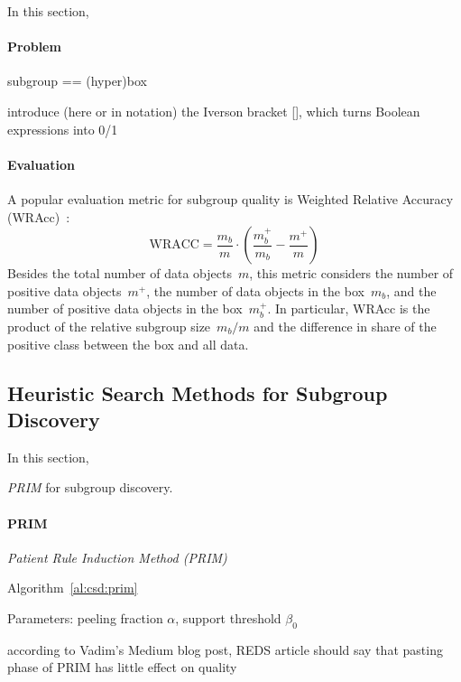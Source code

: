 \documentclass{article}
\theoremstyle{definition}
\begin{document}
In this section,

\paragraph{Problem}

subgroup == (hyper)box

introduce (here or in notation) the Iverson bracket [], which turns Boolean expressions into 0/1

\paragraph{Evaluation}

A popular evaluation metric for subgroup quality is Weighted Relative Accuracy (WRAcc)~\cite{lavravc1999rule}:
%
\begin{equation}
	\text{WRACC} = \frac{m_b}{m} \cdot \left( \frac{m_b^+}{m_b} - \frac{m^+}{m} \right)
	\label{eq:csd:wracc}
\end{equation}
%
Besides the total number of data objects~$m$, this metric considers the number of positive data objects~$m^+$, the number of data objects in the box~$m_b$, and the number of positive data objects in the box~$m_b^+$.
In particular, WRAcc is the product of the relative subgroup size~$m_b / m$ and the difference in share of the positive class between the box and all data.

\subsection{Heuristic Search Methods for Subgroup Discovery}
\label{sec:csd:fundamentals:heuristics}

In this section,

\begin{algorithm}[t]
	\DontPrintSemicolon
	\caption{\emph{PRIM} for subgroup discovery.}
	\label{al:csd:prim}
\end{algorithm}

\paragraph{PRIM}

\emph{Patient Rule Induction Method (PRIM)}~\cite{friedman1999bump}

Algorithm~\ref{al:csd:prim}

Parameters: peeling fraction $\alpha$, support threshold $\beta_0$

according to Vadim's Medium blog post, REDS article should say that pasting phase of PRIM has little effect on quality
\end{document}
